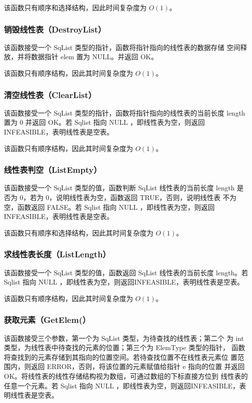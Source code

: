 \documentclass[supercite]{Experimental_Report}
\theoremstyle{definition}
\begin{document}
该函数只有顺序和选择结构，因此时间复杂度为 $O(1)$。
\subsubsection{销毁线性表（DestroyList）}
该函数接受一个 SqList 类型的指针，函数将指针指向的线性表的数据存储
空间释放，并将数据指针 elem 置为 NULL。并返回 OK。

该函数只有顺序结构，因此其时间复杂度为 $O(1)$。
\subsubsection{清空线性表（ClearList）}
该函数接受一个 SqList 类型的指针，函数将指针指向的线性表的当前长度
length 置为 0 并返回 OK。若 Sqlist 指向 NULL ，即线性表为空，则返回INFEASIBLE，表明线性表是空表。

该函数只有顺序结构，因此其时间复杂度为 $O(1)$。
\subsubsection{线性表判空（ListEmpty）}
该函数接受一个 SqList 类型的值，函数判断 SqList 线性表的当前长度
length 是否为 0，若为 0，说明线性表为空，函数返回 TRUE，否则，说明线性表
不为空，函数返回 FALSE。若 Sqlist 指向 NULL ，即线性表为空，则返回INFEASIBLE，表明线性表是空表。

该函数只有顺序和选择结构，因此其时间复杂度为 $O(1)$。

\subsubsection{求线性表长度（ListLength）}
该函数接受一个 SqList 类型的值，函数返回 SqList 线性表的当前长度
length。若 Sqlist 指向 NULL ，即线性表为空，则返回INFEASIBLE，表明线性表是空表。

该函数只有顺序结构，因此其时间复杂度为 $O(1)$。
\subsubsection{获取元素（GetElem(）}
该函数接受三个参数，第一个为 SqList 类型，为待查找的线性表；第二个
为 int 类型，为线性表中待查找的元素的位置；第三个为 ElemType 类型的指针，
函数将查找到的元素存储到其指向的位置空间。若待查找位置不在线性表元素位
置范围内，则返回 ERROR，否则，将该位置的元素赋值给指针 e 指向的位置
并返回 OK。将线性表的线性存储结构视为数组，可通过数组的下标直接方位到
线性表的任意一个元素。若 Sqlist 指向 NULL ，即线性表为空，则返回INFEASIBLE，表明线性表是空表。
\end{document}
